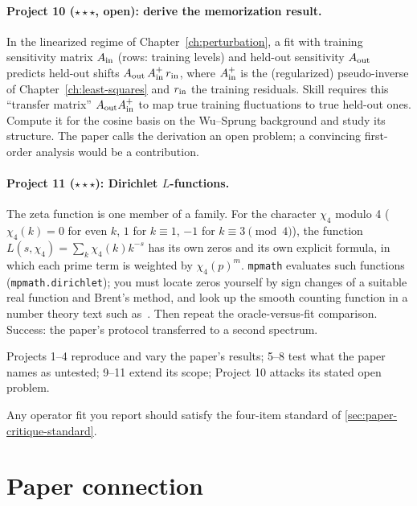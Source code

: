\paragraph{Project 10 ($\star\star\star$, open): derive the memorization result.} In the linearized regime of Chapter~\ref{ch:perturbation}, a fit with training sensitivity matrix $A_{\rm in}$ (rows: training levels) and held-out sensitivity $A_{\rm out}$ predicts held-out shifts $A_{\rm out}\,A_{\rm in}^{+}\,r_{\rm in}$, where $A_{\rm in}^{+}$ is the (regularized) pseudo-inverse of Chapter~\ref{ch:least-squares} and $r_{\rm in}$ the training residuals. Skill requires this ``transfer matrix'' $A_{\rm out}A_{\rm in}^{+}$ to map true training fluctuations to true held-out ones. Compute it for the cosine basis on the Wu--Sprung background and study its structure. The paper calls the derivation an open problem; a convincing first-order analysis would be a contribution.

\paragraph{Project 11 ($\star\star\star$): Dirichlet $L$-functions.} The zeta function is one member of a family. For the character $\chi_4$ modulo 4 ($\chi_4(k)=0$ for even $k$, $1$ for $k\equiv1$, $-1$ for $k\equiv3 \pmod 4$), the function $L(s,\chi_4)=\sum_k\chi_4(k)k^{-s}$ has its own zeros and its own explicit formula, in which each prime term is weighted by $\chi_4(p)^m$. \texttt{mpmath} evaluates such functions (\texttt{mpmath.dirichlet}); you must locate zeros yourself by sign changes of a suitable real function and Brent's method, and look up the smooth counting function in a number theory text such as~\cite{davenport}. Then repeat the oracle-versus-fit comparison. Success: the paper's protocol transferred to a second spectrum.

\begin{keyideas}
\item Projects 1--4 reproduce and vary the paper's results; 5--8 test what the paper names as untested; 9--11 extend its scope; Project 10 attacks its stated open problem.
\item Any operator fit you report should satisfy the four-item standard of \cref{sec:paper-critique-standard}.
\end{keyideas}

\section{Paper connection}\label{sec:paper-critique-paper}

